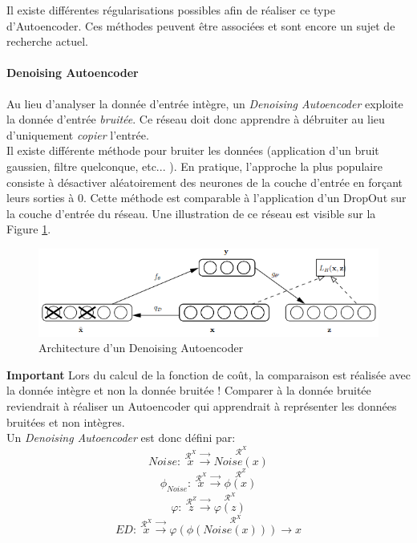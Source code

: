 \noindent Il existe différentes régularisations possibles afin de réaliser ce type d'Autoencoder. Ces méthodes peuvent être associées et sont encore un sujet de recherche actuel.

\paragraph{Denoising Autoencoder}
Au lieu d'analyser la donnée d'entrée intègre, un \textit{Denoising Autoencoder}\cite{denoisingauto} exploite la donnée d'entrée \textit{bruitée}. Ce réseau doit donc apprendre à débruiter au lieu d'uniquement \textit{copier} l'entrée.\\

\noindent Il existe différente méthode pour bruiter les données (application d'un bruit gaussien, filtre quelconque, etc... ). En pratique, l'approche la plus populaire consiste à désactiver aléatoirement des neurones de la couche d'entrée en forçant leurs sorties à 0. Cette méthode est comparable à l'application d'un DropOut sur la couche d'entrée du réseau. Une illustration de ce réseau est visible sur la Figure \ref{denoiseauto}.\\

\begin{figure}
    \centering
    \includegraphics[scale=0.4]{./tex/encoder-decoder-network/denoiseauto.png}
    \caption{Architecture d'un Denoising Autoencoder}
    \label{denoiseauto}
\end{figure}

\noindent \textbf{Important} Lors du calcul de la fonction de coût, la comparaison est réalisée avec la donnée intègre et non la donnée bruitée ! Comparer à la donnée bruitée reviendrait à réaliser un Autoencoder qui apprendrait à représenter les données bruitées et non intègres.\\

\noindent Un \textit{Denoising Autoencoder} est donc défini par:
$$Noise: \ \stackrel{\mathcal{R}^X}{x} \stackrel{\rightarrow}{\longrightarrow} \stackrel{\mathcal{R}^X}{Noise(x)}$$
$$\phi_{Noise}: \ \stackrel{\mathcal{R}^X}{x} \stackrel{\rightarrow}{\longrightarrow} \stackrel{\mathcal{R}^Z}{\phi(x)}$$
$$\varphi: \ \stackrel{\mathcal{R}^Z}{z} \stackrel{\rightarrow}{\longrightarrow} \stackrel{\mathcal{R}^X}{\varphi(z)}$$
$$ED: \ \stackrel{\mathcal{R}^X}{x} \stackrel{\rightarrow}{\longrightarrow} \stackrel{\mathcal{R}^X}{\varphi(\phi(Noise(x)))\rightarrow x}$$

